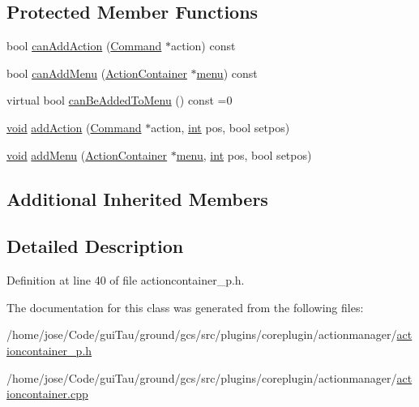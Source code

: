\subsection*{Protected Member Functions}
\begin{DoxyCompactItemize}
\item 
bool \hyperlink{group___core_plugin_ga506d6f367240b15d691c878fa0e9935d}{can\-Add\-Action} (\hyperlink{class_core_1_1_command}{Command} $\ast$action) const 
\item 
bool \hyperlink{group___core_plugin_gadbde4aa31f9950d994f21baf55bea0ae}{can\-Add\-Menu} (\hyperlink{class_core_1_1_action_container}{Action\-Container} $\ast$\hyperlink{group___core_plugin_ga243949a2b2abff30862e34f6313f28c0}{menu}) const 
\item 
virtual bool \hyperlink{group___core_plugin_gad94e8e4c0fa2c17d3de9edb24be32b17}{can\-Be\-Added\-To\-Menu} () const =0
\item 
\hyperlink{group___u_a_v_objects_plugin_ga444cf2ff3f0ecbe028adce838d373f5c}{void} \hyperlink{group___core_plugin_ga7fa37dae076bbf750250911084354f3c}{add\-Action} (\hyperlink{class_core_1_1_command}{Command} $\ast$action, \hyperlink{ioapi_8h_a787fa3cf048117ba7123753c1e74fcd6}{int} pos, bool setpos)
\item 
\hyperlink{group___u_a_v_objects_plugin_ga444cf2ff3f0ecbe028adce838d373f5c}{void} \hyperlink{group___core_plugin_ga8b0bc3351ea9c87b7e95bac15c82eb52}{add\-Menu} (\hyperlink{class_core_1_1_action_container}{Action\-Container} $\ast$\hyperlink{group___core_plugin_ga243949a2b2abff30862e34f6313f28c0}{menu}, \hyperlink{ioapi_8h_a787fa3cf048117ba7123753c1e74fcd6}{int} pos, bool setpos)
\end{DoxyCompactItemize}
\subsection*{Additional Inherited Members}


\subsection{Detailed Description}


Definition at line 40 of file actioncontainer\-\_\-p.\-h.



The documentation for this class was generated from the following files\-:\begin{DoxyCompactItemize}
\item 
/home/jose/\-Code/gui\-Tau/ground/gcs/src/plugins/coreplugin/actionmanager/\hyperlink{actioncontainer__p_8h}{actioncontainer\-\_\-p.\-h}\item 
/home/jose/\-Code/gui\-Tau/ground/gcs/src/plugins/coreplugin/actionmanager/\hyperlink{actioncontainer_8cpp}{actioncontainer.\-cpp}\end{DoxyCompactItemize}
